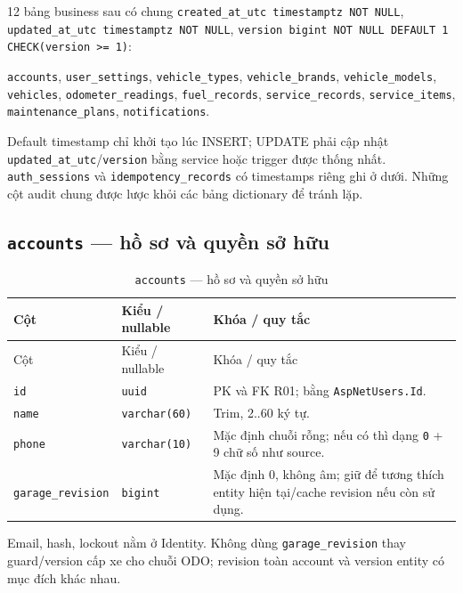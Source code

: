 12 bảng business sau có chung \texttt{created\_\allowbreak{}at\_\allowbreak{}utc timestamptz NOT NULL}, \texttt{updated\_\allowbreak{}at\_\allowbreak{}utc timestamptz NOT NULL}, \texttt{version bigint NOT NULL DEFAULT 1 CHECK(version >= 1)}:\par
\texttt{accounts}, \texttt{user\_\allowbreak{}settings}, \texttt{vehicle\_\allowbreak{}types}, \texttt{vehicle\_\allowbreak{}brands}, \texttt{vehicle\_\allowbreak{}models}, \texttt{vehicles}, \texttt{odometer\_\allowbreak{}readings}, \texttt{fuel\_\allowbreak{}records}, \texttt{service\_\allowbreak{}records}, \texttt{service\_\allowbreak{}items}, \texttt{maintenance\_\allowbreak{}plans}, \texttt{notifications}.\par
Default timestamp chỉ khởi tạo lúc INSERT; UPDATE phải cập nhật \texttt{updated\_\allowbreak{}at\_\allowbreak{}utc}/\texttt{version} bằng service hoặc trigger được thống nhất. \texttt{auth\_\allowbreak{}sessions} và \texttt{idempotency\_\allowbreak{}records} có timestamps riêng ghi ở dưới. Những cột audit chung được lược khỏi các bảng dictionary để tránh lặp.\par
\subsection{\texttt{accounts} — hồ sơ và quyền sở hữu}
\begin{smalltable}\begin{longtable}{L{3.0cm}L{3.2cm}L{8.2cm}}
\caption{\texttt{accounts} — hồ sơ và quyền sở hữu}\label{tab:dictionary-3}\\\toprule
Cột & Kiểu / nullable & Khóa / quy tắc\\\midrule\endfirsthead
\toprule Cột & Kiểu / nullable & Khóa / quy tắc\\\midrule\endhead
\texttt{id} & \texttt{uuid} & PK và FK R01; bằng \texttt{AspNetUsers.Id}.\\
\texttt{name} & \texttt{varchar(60)} & Trim, 2..60 ký tự.\\
\texttt{phone} & \texttt{varchar(10)} & Mặc định chuỗi rỗng; nếu có thì dạng \texttt{0} + 9 chữ số như source.\\
\texttt{garage\_\allowbreak{}revision} & \texttt{bigint} & Mặc định 0, không âm; giữ để tương thích entity hiện tại/cache revision nếu còn sử dụng.\\
\bottomrule\end{longtable}\end{smalltable}
Email, hash, lockout nằm ở Identity. Không dùng \texttt{garage\_\allowbreak{}revision} thay guard/version cấp xe cho chuỗi ODO; revision toàn account và version entity có mục đích khác nhau.\par
